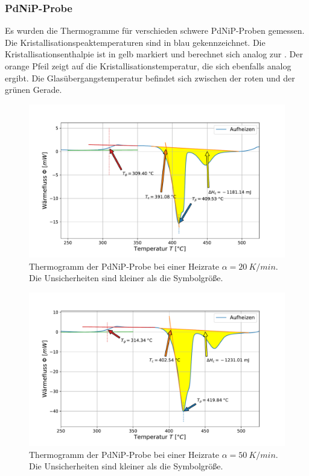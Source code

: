 \documentclass[
	a4paper,
	12pt,
	pagesize,
	ngerman
]{scrartcl}
\begin{document}
	\subsubsection*{PdNiP-Probe}
	Es wurden die Thermogramme  für verschieden schwere PdNiP-Proben gemessen.
	Die Kristallisationspeaktemperaturen sind in blau gekennzeichnet.
	Die Kristallisationsenthalpie ist in gelb markiert und berechnet sich analog zur .
	Der orange Pfeil zeigt auf die Kristallisationstemperatur, die sich ebenfalls analog ergibt.
	Die Glasübergangstemperatur befindet sich zwischen der roten und der grünen Gerade.

	\begin{figure}[H]
			\includegraphics[width=\linewidth]{img/Kalorimetrie_pdnip_20.pdf}
			\caption{
				Thermogramm der PdNiP-Probe bei einer Heizrate $\alpha = \SI{20}{K/min}$.
			Die Unsicherheiten sind kleiner als die Symbolgröße.
			}
			\label{fig_themo_pdnip_20}
		\end{figure}
	\begin{figure}[H]
			\includegraphics[width=\linewidth]{img/Kalorimetrie_pdnip_50.pdf}
			\caption{
				Thermogramm der PdNiP-Probe bei einer Heizrate $\alpha = \SI{50}{K/min}$.
			Die Unsicherheiten sind kleiner als die Symbolgröße.
			}
			\label{fig_themo_pdnip_50}
		\end{figure}
\end{document}
